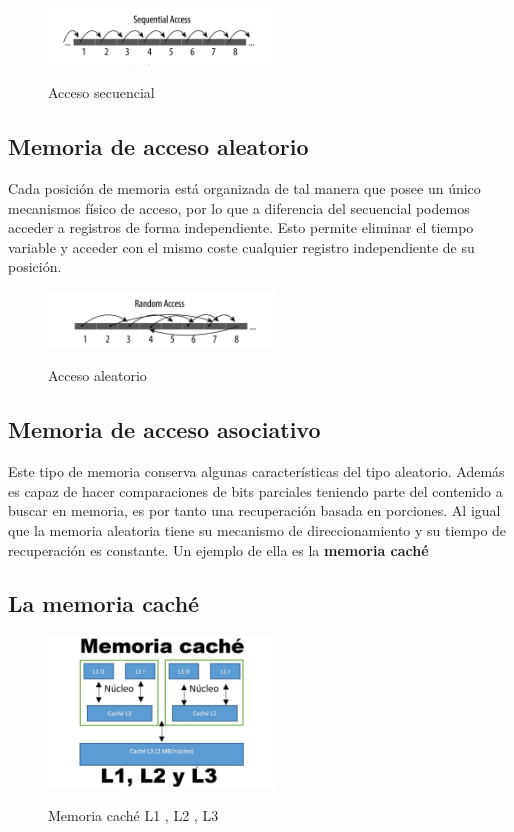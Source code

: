 \documentclass{article}
\begin{document}
    \begin{figure}[h]
    \includegraphics[width=6cm]{images/secuencial.png}
    \centering
    \label{fig:aleatory}
    \caption{Acceso secuencial}
    \end{figure}

\subsection{Memoria de acceso aleatorio} Cada posición de memoria está organizada de tal manera que posee un único mecanismos físico de acceso, por lo que a diferencia del secuencial podemos acceder a registros de forma independiente. Esto permite eliminar el tiempo variable y acceder con el mismo coste cualquier registro independiente de su posición.
 \label{aleatory}
    \begin{figure}[h]
    \includegraphics[width=6cm]{images/aleatorio.png}
    \centering
    \label{fig:aleatory}
    \caption{Acceso aleatorio}
    \end{figure}

\subsection{Memoria de acceso asociativo}
Este tipo de memoria conserva algunas características del tipo aleatorio. Además es capaz de hacer comparaciones de bits parciales teniendo parte del contenido a buscar en memoria, es por tanto una recuperación basada en porciones. Al igual que la memoria aleatoria tiene su mecanismo de direccionamiento y su tiempo de recuperación es constante.
Un ejemplo de ella es la \textbf{memoria caché}

\subsection{La memoria caché}
    \begin{figure}[h]
    \includegraphics[width=6cm]{images/cache.jpg}
    \centering
    \label{fig:aleatory}
    \caption{Memoria caché L1 , L2 , L3}
    \end{figure}
\end{document}
